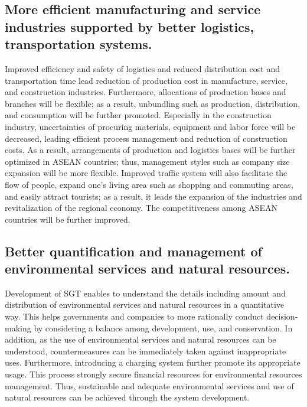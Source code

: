 \subsection{More efficient manufacturing and service industries supported by better logistics, transportation systems.}

\tab Improved efficiency and safety of logistics and reduced distribution cost and transportation time lead reduction of production cost in manufacture, service, and construction industries. Furthermore, allocations of production bases and branches will be flexible; as a result, unbundling such as production, distribution, and consumption will be further promoted. Especially in the construction industry, uncertainties of procuring materials, equipment and labor force will be decreased, leading efficient process management and reduction of construction costs. As a result, arrangements of production and logistics bases will be further optimized in ASEAN countries; thus, management styles such as company size expansion will be more flexible. Improved traffic system will also facilitate the flow of people, expand one’s living area such as shopping and commuting areas, and easily attract tourists; as a result, it leads the expansion of the industries and revitalization of the regional economy. The competitiveness among ASEAN countries will be further improved.

\subsection{Better quantification and management of environmental services and natural resources.}

\tab Development of SGT enables to understand the details including amount and distribution of environmental services and natural resources in a quantitative way. This helps governments and companies to more rationally conduct decision-making by considering a balance among development, use, and conservation. In addition, as the use of environmental services and natural resources can be understood, countermeasures can be immediately taken against inappropriate uses. Furthermore, introducing a charging system further promote its appropriate usage. This process strongly secure financial resources for environmental resources management. Thus, sustainable and adequate environmental services and use of natural resources can be achieved through the system development.





